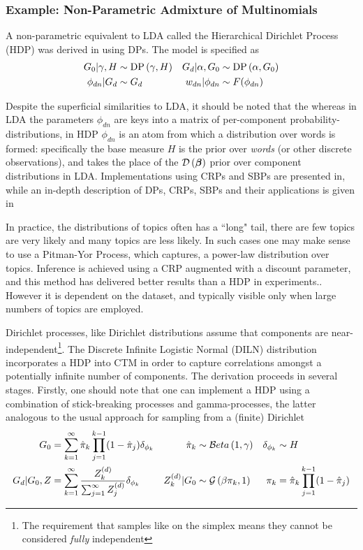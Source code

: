 \subsubsection*{Example: Non-Parametric Admixture of Multinomials}
A non-parametric equivalent to LDA called the Hierarchical Dirichlet Process (HDP) was derived in \cite{Teh2006b} using DPs. The model is specified as
\begin{align}
G_0 | \gamma, H & \sim \text{DP} \left( {\gamma, H } \right) &
G_d | \alpha, G_0 & \sim \text{DP} \left( {\alpha, G_0} \right) \\
\phi_{dn} |G_d &\sim G_d & w_{dn} | \phi_{dn} & \sim F(\phi_{dn})
\end{align}

Despite the superficial similarities to LDA, it should be noted that the whereas in LDA the parameters $\phi_{dn}$ are keys into a matrix of per-component probability-distributions, in HDP $\phi_{dn}$ is an atom from which a distribution over words is formed: specifically the base measure $H$ is the prior over \emph{words} (or other discrete observations), and takes the place of the $\mathcal{D} \left( {\bm \beta} \right)$ prior over component distributions in LDA. Implementations using CRPs and SBPs are presented in\cite{Teh2006b}, while an in-depth description of DPs, CRPs, SBPs and their applications is given in\cite{JordanMichael2005a}

In practice, the distributions of topics often has a ``long" tail, there are few topics are very likely and many topics are less likely\cite{Wallach2009a}. In such cases one may make sense to use a Pitman-Yor Process, which captures, a power-law distribution over topics. Inference is achieved using a CRP augmented with a discount parameter, and this method has delivered better results than a HDP in experiments.\cite{Buntine2014}. However it is dependent on the dataset, and typically visible only when large numbers of topics are employed. 

Dirichlet processes, like Dirichlet distributions assume that components are near-independent\footnote{The requirement that samples like on the simplex means they cannot be considered \emph{fully} independent}. The Discrete Infinite Logistic Normal (DILN) distribution\cite{Paisley2012}\cite{Paisley2012b} incorporates a HDP into CTM in order to capture correlations amongst a potentially infinite number of components. The derivation proceeds in several stages. 
Firstly, one should note that one can implement a HDP using a combination of stick-breaking processes and gamma-processes, the latter analogous to the usual approach for sampling from a (finite) Dirichlet
\begin{align}
G_0 & = \sum_{k=1}^\infty \hat{\pi}_k \prod_{j=1}^{k-1} (1 - \hat{\pi}_j)\delta_{\phi_k} & 
\hat{\pi}_k & \sim \mathcal{B}eta\left(1, \gamma\right) &
\delta_{\phi_k} & \sim H \\
G_d|G_0, Z & = \sum_{k=1}^\infty \frac{Z_k^{(d)}}{\sum_{j=1}^\infty Z_j^{(d)}} \delta_{\phi_k} &
Z_k^{(d)} | G_0 &\sim \mathcal{G} \left( {\beta \pi_k}, {1} \right) &
\pi_k & = \hat{\pi}_k \prod_{j=1}^{k-1} (1 - \hat{\pi}_j)
\end{align}

